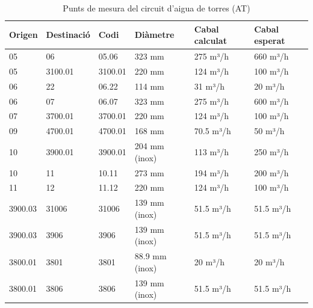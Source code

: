 \documentclass[11pt]{article}
\begin{document}
\begin{table}[htbp]
    \centering
    \caption{Punts de mesura del circuit d'aigua de torres (AT)}
    \label{tab:taula_punts_at}
    \begin{tabular}{llllll}
        \toprule
        \textbf{Origen} & \textbf{Destinació} & \textbf{Codi} & \textbf{Diàmetre} & \textbf{Cabal calculat} & \textbf{Cabal esperat} \\
        \midrule
        05              & 06                  & 05.06         & 323 mm            & 275 m³/h                & 660 m³/h               \\
        05              & 3100.01             & 3100.01       & 220 mm            & 124 m³/h                & 100 m³/h               \\
        06              & 22                  & 06.22         & 114 mm            & 31 m³/h                 & 20 m³/h                \\
        06              & 07                  & 06.07         & 323 mm            & 275 m³/h                & 600 m³/h               \\
        07              & 3700.01             & 3700.01       & 220 mm            & 124 m³/h                & 100 m³/h               \\
        09              & 4700.01             & 4700.01       & 168 mm            & 70.5 m³/h               & 50 m³/h                \\
        10              & 3900.01             & 3900.01       & 204 mm (inox)     & 113 m³/h                & 250 m³/h               \\
        10              & 11                  & 10.11         & 273 mm            & 194 m³/h                & 200 m³/h               \\
        11              & 12                  & 11.12         & 220 mm            & 124 m³/h                & 100 m³/h               \\
        3900.03         & 31006               & 31006         & 139 mm (inox)     & 51.5 m³/h               & 51.5 m³/h              \\
        3900.03         & 3906                & 3906          & 139 mm (inox)     & 51.5 m³/h               & 51.5 m³/h              \\
        3800.01         & 3801                & 3801          & 88.9 mm (inox)    & 20 m³/h                 & 20 m³/h                \\
        3800.01         & 3806                & 3806          & 139 mm (inox)     & 51.5 m³/h               & 51.5 m³/h              \\
        \bottomrule
    \end{tabular}
\end{table}
\end{document}
